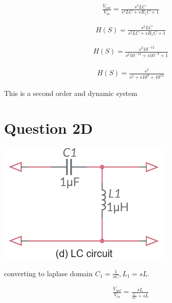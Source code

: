 \documentclass{article}
\begin{document}
\begin{equation*}
    \begin{aligned}
        \frac{V_{out}}{V_{in}} = \frac{s^2LC}{s^2LC + sR_1C + 1}
    \end{aligned}
\end{equation*}

\begin{equation*}
    \begin{aligned}
        H(S) = \frac{s^2 LC}{s^2LC + sR_1C + 1}
    \end{aligned}
\end{equation*}

\begin{equation*}
    \begin{aligned}
        H(S) = \frac{s^2 10^{-12}}{s^2 10^{-12} + s10^{-3} + 1}
    \end{aligned}
\end{equation*}

\begin{equation*}
    \begin{aligned}
        H(S) = \frac{s^2}{s^2 + s10^{9} + 10^{12}}
    \end{aligned}
\end{equation*}

This is a second order and dynamic system


\section{Question 2D}
\begin{center}
    \includegraphics[scale=0.7]{2d.png}

\end{center}

converting to laplase domain
$
    C_1 = \frac{1}{sC}, L_1 = sL
$.

\begin{equation*}
    \begin{aligned}
        \frac{V_{out}}{V_{in}} = \frac{sL}{\frac{1}{sC} + sL}
    \end{aligned}
\end{equation*}
\end{document}
